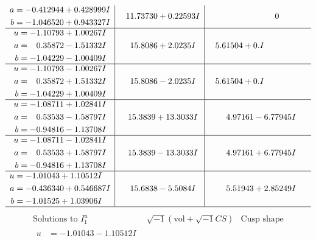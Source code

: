 \documentclass[1p]{elsarticle_modified}
\theoremstyle{definition}
\newcommand{\I}{\sqrt{-1}}
\begin{document}
$$\begin{array}{c|c|c}
\begin{aligned}
a &= -0.412944 + 0.428999 I \\
b &= -1.046520 + 0.943327 I\end{aligned}
 & \phantom{-}11.73730 + 0.22593 I & \phantom{-0.000000 } 0 \\ \hline\begin{aligned}
u &= -1.10793 + 1.00267 I \\
a &= \phantom{-}0.35872 - 1.51332 I \\
b &= -1.04229 - 1.00409 I\end{aligned}
 & \phantom{-}15.8086 + 2.0235 I & \phantom{-}5.61504 + 0. I\phantom{ +0.000000I} \\ \hline\begin{aligned}
u &= -1.10793 - 1.00267 I \\
a &= \phantom{-}0.35872 + 1.51332 I \\
b &= -1.04229 + 1.00409 I\end{aligned}
 & \phantom{-}15.8086 - 2.0235 I & \phantom{-}5.61504 + 0. I\phantom{ +0.000000I} \\ \hline\begin{aligned}
u &= -1.08711 + 1.02841 I \\
a &= \phantom{-}0.53533 - 1.58797 I \\
b &= -0.94816 - 1.13708 I\end{aligned}
 & \phantom{-}15.3839 + 13.3033 I & \phantom{-}4.97161 - 6.77945 I \\ \hline\begin{aligned}
u &= -1.08711 - 1.02841 I \\
a &= \phantom{-}0.53533 + 1.58797 I \\
b &= -0.94816 + 1.13708 I\end{aligned}
 & \phantom{-}15.3839 - 13.3033 I & \phantom{-}4.97161 + 6.77945 I \\ \hline\begin{aligned}
u &= -1.01043 + 1.10512 I \\
a &= -0.436340 + 0.546687 I \\
b &= -1.01525 + 1.03906 I\end{aligned}
 & \phantom{-}15.6838 - 5.5084 I & \phantom{-}5.51943 + 2.85249 I\\
 \hline 
 \end{array}$$\newpage$$\begin{array}{c|c|c}  
\text{Solutions to }I^u_{1}& \I (\text{vol} + \sqrt{-1}CS) & \text{Cusp shape}\\
 \hline 
\begin{aligned}
u &= -1.01043 - 1.10512 I \\

\end{aligned}
\end{array}$$
\end{document}
